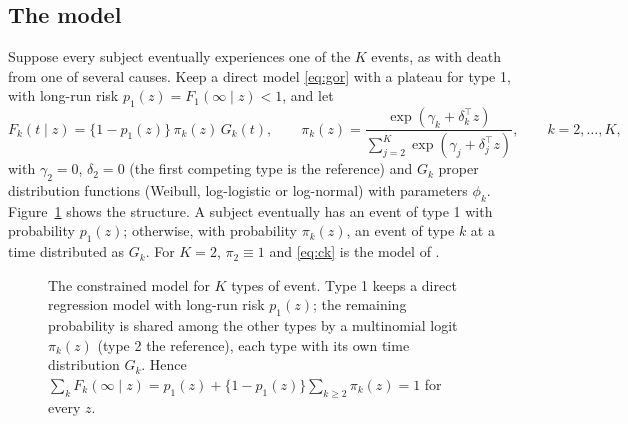 \documentclass[11pt]{article}
\newcommand{\T}{\top}
\begin{document}
\subsection{The model}
Suppose every subject eventually experiences one of the $K$ events, as with death from one of
several causes. Keep a direct model \eqref{eq:gor} with a plateau for type 1, with long-run risk
$p_1(z) = F_1(\infty \mid z) < 1$, and let
\begin{equation}\label{eq:ck}
F_k(t \mid z) = \{1 - p_1(z)\}\,\pi_k(z)\,G_k(t), \qquad
\pi_k(z) = \frac{\exp(\gamma_k + \delta_k^\T z)}{\sum_{j=2}^K \exp(\gamma_j + \delta_j^\T z)},
\qquad k = 2, \dots, K,
\end{equation}
with $\gamma_2 = 0$, $\delta_2 = 0$ (the first competing type is the reference) and $G_k$ proper
distribution functions (Weibull, log-logistic or log-normal) with parameters $\phi_k$.
Figure~\ref{fig:concept} shows the structure. A subject eventually has an event of type 1 with
probability $p_1(z)$; otherwise, with probability $\pi_k(z)$, an event of type $k$ at a time
distributed as $G_k$. For $K = 2$, $\pi_2 \equiv 1$ and \eqref{eq:ck} is the model of
\citet{shi2013}.

\begin{figure}[t]
\centering
{}
\caption{The constrained model for $K$ types of event. Type 1 keeps a direct regression model with
long-run risk $p_1(z)$; the remaining probability is shared among the other types by a multinomial
logit $\pi_k(z)$ (type 2 the reference), each type with its own time distribution $G_k$. Hence
$\sum_k F_k(\infty \mid z) = p_1(z) + \{1 - p_1(z)\}\sum_{k \ge 2}\pi_k(z) = 1$ for every $z$.}
\label{fig:concept}
\end{figure}
\end{document}
